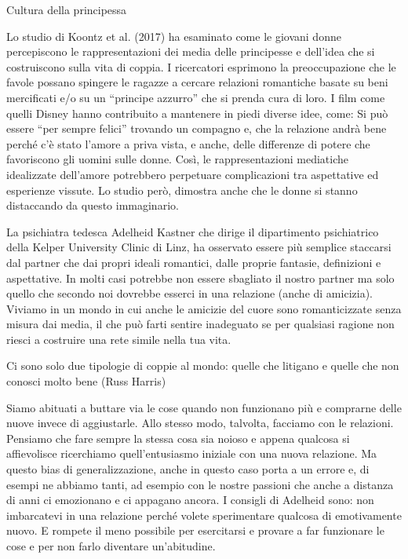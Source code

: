\documentclass[12pt]{book} %
\begin{document}
\begin{mdframed}[linewidth=1pt]
Cultura della principessa

Lo studio di Koontz et al. (2017) ha esaminato
come le giovani donne percepiscono le rappresentazioni dei media delle principesse e dell'idea che
si costruiscono sulla vita di coppia. I ricercatori esprimono la preoccupazione che le favole possano spingere le
ragazze a cercare relazioni romantiche basate su beni mercificati e/o su un “principe azzurro” che si prenda cura di
loro. I film come quelli Disney hanno contribuito a mantenere in piedi diverse idee, come: Si può essere “per sempre
felici” trovando un compagno e, che la relazione andrà bene perché c'è stato
l'amore a priva vista, e anche, delle differenze di potere che favoriscono gli uomini sulle donne.
Così, le rappresentazioni mediatiche idealizzate dell'amore potrebbero perpetuare complicazioni
tra aspettative ed esperienze vissute. Lo studio però, dimostra anche che le donne si stanno distaccando da questo
immaginario.
\end{mdframed}

La psichiatra tedesca Adelheid Kastner che dirige il dipartimento psichiatrico della Kelper University Clinic di Linz,
ha osservato essere più semplice staccarsi dal partner che dai propri ideali romantici, dalle proprie fantasie, definizioni
e aspettative. In molti casi potrebbe non essere sbagliato il nostro partner ma solo quello che secondo noi dovrebbe
esserci in una relazione (anche di amicizia). Viviamo in un mondo in cui anche le
amicizie del cuore sono romanticizzate senza misura dai media, il che può farti sentire inadeguato se per qualsiasi
ragione non riesci a costruire una rete simile nella tua vita. 

Ci sono solo due tipologie di coppie al mondo: quelle che litigano e quelle che non conosci molto bene (Russ Harris)

Siamo abituati a buttare via le cose quando non funzionano più e comprarne delle nuove invece di aggiustarle. Allo
stesso modo, talvolta, facciamo con le relazioni. Pensiamo che fare sempre la stessa cosa sia noioso e appena qualcosa si
affievolisce ricerchiamo quell'entusiasmo iniziale con una nuova relazione. Ma questo bias di
generalizzazione, anche in questo caso porta a un errore e, di esempi ne abbiamo tanti, ad esempio con le nostre
passioni che anche a distanza di anni ci emozionano e ci appagano ancora. I consigli di Adelheid sono: non imbarcatevi
in una relazione perché volete sperimentare qualcosa di emotivamente nuovo. E rompete il meno possibile per esercitarsi
e provare a far funzionare le cose e per non farlo diventare
un'abitudine.
\end{document}
